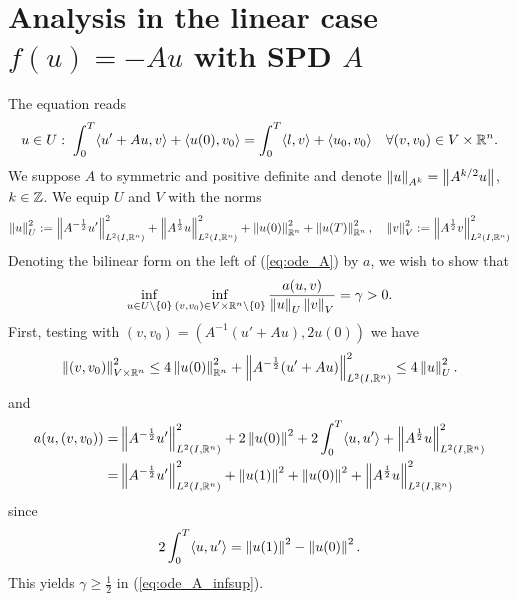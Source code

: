 \documentclass[english,12pt,a4paper]{article}
\begin{document}
\section{Analysis in the linear case $f(u)=-Au$ with SPD $A$}\label{sec:}
%
The equation reads
%
\begin{equation}\label{eq:ode_A}
u\in U:\; \int_0^T \langle u' +Au,v\rangle + \langle u(0),v_0\rangle = \int_0^T \langle l,v\rangle + \langle u_0,v_0\rangle \quad\forall (v,v_0)\in V\times\mathbb R^n.
\end{equation}
%
%
We suppose $A$ to symmetric and positive definite and denote $\left\|u\right\|_{A^k}=\left\|A^{k/2}u\right\|$, $k\in\mathbb Z$. We equip $U$ and $V$ with the norms
%
\begin{align*}
\left\|u\right\|_U^2 := \left\|A^{-\frac12}u'\right\|^2_{L^2(I,\mathbb R^n)} + \left\|A^{\frac12}u\right\|^2_{L^2(I,\mathbb R^n)} + \left\|u(0)\right\|^2_{\mathbb R^n} + \left\|u(T)\right\|^2_{\mathbb R^n},\quad 
\left\|v\right\|_V^2 := \left\|A^{\frac12}v\right\|^2_{L^2(I,\mathbb R^n)}
\end{align*}
%
Denoting the bilinear form on the left of (\ref{eq:ode_A}) by $a$, we wish to show that
%
\begin{equation}\label{eq:ode_A_infsup}
\inf_{u\in U\setminus\left\{0\right\}}\inf_{(v,v_0)\in V\times\mathbb R^n\setminus\left\{0\right\}} \frac{a(u,v)}{\left\|u\right\|_U\left\|v\right\|_V}=\gamma>0.
\end{equation}
%
First, testing with $(v,v_0)=(A^{-1}(u'+ Au),2u(0))$ we have
%
\begin{align*}
\left\|(v,v_0)\right\|^2_{V\times\mathbb R^n} \le 4\left\|u(0)\right\|^2_{\mathbb R^n} + \left\|A^{-\frac12}(u'+ Au)\right\|^2_{L^2(I,\mathbb R^n)} \le 4\left\|u\right\|^2_U.
\end{align*}
%
and
%
\begin{align*}
a(u, (v,v_0)) =& \left\|A^{-\frac12}u'\right\|^2_{L^2(I,\mathbb R^n)} + 2\left\|u(0)\right\|^2 + 2\int_0^T \langle u,u'\rangle + \left\|A^{\frac12}u\right\|^2_{L^2(I,\mathbb R^n)}\\
=& \left\|A^{-\frac12}u'\right\|^2_{L^2(I,\mathbb R^n)} + \left\|u(1)\right\|^2 + \left\|u(0)\right\|^2  + \left\|A^{\frac12}u\right\|^2_{L^2(I,\mathbb R^n)}
\end{align*}
%
since
%
\begin{align*}
 2\int_0^T \langle u,u'\rangle = \left\|u(1)\right\|^2 - \left\|u(0)\right\|^2.
\end{align*}
%
This yields $\gamma\ge\frac12$ in (\ref{eq:ode_A_infsup}).
\end{document}
